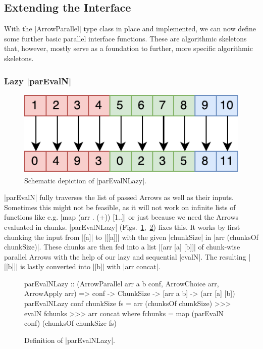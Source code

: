 \subsection{Extending the Interface}
\label{sec:extending-interface}
With the |ArrowParallel| type class in place and implemented, we can now define some further basic parallel interface functions. These are algorithmic skeletons that, however, mostly serve as a foundation to further, more specific algorithmic skeletons.

\subsubsection{Lazy |parEvalN|}
\begin{figure}[tb]
	\includegraphics[scale=0.7]{images/parEvalNLazy}
	\caption{Schematic depiction of |parEvalNLazy|.}
	\label{fig:parEvalNLazyImg}
\end{figure}
|parEvalN| fully traverses the list of passed Arrows as well as their inputs. Sometimes this might not be feasible, as it will not work on infinite lists of functions like e.g. |map (arr . (+)) [1..]| or just because we need the Arrows evaluated in chunks. |parEvalNLazy| (Figs.~\ref{fig:parEvalNLazyImg},~\ref{fig:parEvalNLazy}) fixes this. It works by first chunking the input from |[a]| to |[[a]]| with the given |chunkSize| in |arr (chunksOf chunkSize)|. These chunks are then fed into a list |[arr [a] [b]]| of chunk-wise parallel Arrows with the help of our lazy and sequential |evalN|. The resulting |[[b]]| is lastly converted into |[b]| with |arr concat|.
\begin{figure}[t]
\begin{code}
parEvalNLazy :: (ArrowParallel arr a b conf, ArrowChoice arr, ArrowApply arr) =>
	conf -> ChunkSize -> [arr a b] -> (arr [a] [b])
parEvalNLazy conf chunkSize fs =
	arr (chunksOf chunkSize) >>>
    evalN fchunks >>>
    arr concat
    where
      fchunks = map (parEvalN conf) (chunksOf chunkSize fs)
\end{code} %
\caption{Definition of |parEvalNLazy|.}
\label{fig:parEvalNLazy}
\end{figure}

